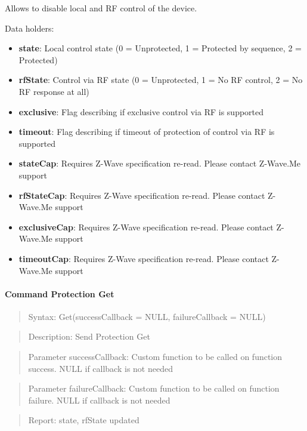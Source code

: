 Allows to disable local and RF control of the device.
\newline

\noindent
Data holders:

\begin{itemize}
\item \textbf{state}: Local control state (0 = Unprotected, 1 = Protected by sequence, 2 = Protected)
\item \textbf{rfState}: Control via RF state (0 = Unprotected, 1 = No RF control, 2 = No RF response at all)
\item \textbf{exclusive}: Flag describing if exclusive control via RF is supported
\item \textbf{timeout}: Flag describing if timeout of protection of control via RF is supported
\item \textbf{stateCap}: Requires Z-Wave specification re-read. Please contact Z-Wave.Me support
\item \textbf{rfStateCap}: Requires Z-Wave specification re-read. Please contact Z-Wave.Me support
\item \textbf{exclusiveCap}: Requires Z-Wave specification re-read. Please contact Z-Wave.Me support
\item \textbf{timeoutCap}: Requires Z-Wave specification re-read. Please contact Z-Wave.Me support
\end{itemize}

\paragraph{Command Protection Get}
\begin{quote}Syntax: Get(successCallback = NULL, failureCallback = NULL)\end{quote}
\begin{quote}Description: Send Protection Get\end{quote}
\begin{quote}Parameter successCallback: Custom function to be called on function success. NULL if callback is not needed\end{quote}
\begin{quote}Parameter failureCallback: Custom function to be called on function failure. NULL if callback is not needed\end{quote}
\begin{quote}Report: state, rfState updated\end{quote}

